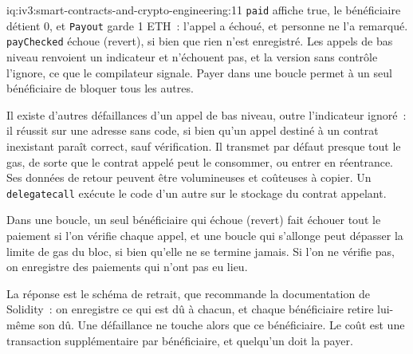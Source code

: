 \begin{solution}{iq:iv3:smart-contracts-and-crypto-engineering:11}
\texttt{paid} affiche true, le bénéficiaire détient 0, et \texttt{Payout} garde 1 ETH~: l'appel a échoué, et personne ne l'a remarqué. \texttt{payChecked} échoue (revert), si bien que rien n'est enregistré. Les appels de bas niveau renvoient un indicateur et n'échouent pas, et la version sans contrôle l'ignore, ce que le compilateur signale. Payer dans une boucle permet à un seul bénéficiaire de bloquer tous les autres.

Il existe d'autres défaillances d'un appel de bas niveau, outre l'indicateur ignoré~: il réussit sur une adresse sans code, si bien qu'un appel destiné à un contrat inexistant paraît correct, sauf vérification. Il transmet par défaut presque tout le gas, de sorte que le contrat appelé peut le consommer, ou entrer en réentrance. Ses données de retour peuvent être volumineuses et coûteuses à copier. Un \texttt{delegatecall} exécute le code d'un autre sur le stockage du contrat appelant.

Dans une boucle, un seul bénéficiaire qui échoue (revert) fait échouer tout le paiement si l'on vérifie chaque appel, et une boucle qui s'allonge peut dépasser la limite de gas du bloc, si bien qu'elle ne se termine jamais. Si l'on ne vérifie pas, on enregistre des paiements qui n'ont pas eu lieu.

La réponse est le schéma de retrait, que recommande la documentation de Solidity~: on enregistre ce qui est dû à chacun, et chaque bénéficiaire retire lui-même son dû. Une défaillance ne touche alors que ce bénéficiaire. Le coût est une transaction supplémentaire par bénéficiaire, et quelqu'un doit la payer.

\end{solution}

